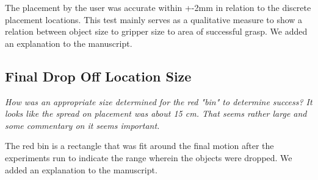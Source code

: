 \documentclass[letterpaper, 10 pt, twocolumn, conference]{article}
\begin{document}
The placement by the user was accurate within +-2mm in relation to the discrete placement locations. This test mainly serves as a qualitative measure to show a relation between object size to gripper size to area of successful grasp. We added an explanation to the manuscript. 

\subsection{Final Drop Off Location Size}
\textit{How was an appropriate size determined for the red "bin" to determine success? It looks like the spread on placement was about 15 cm. That seems rather large and some commentary on it seems important.}

The red bin is a rectangle that was fit around the final motion after the experiments run to indicate the range wherein the objects were dropped. We added an explanation to the manuscript.
\end{document}
